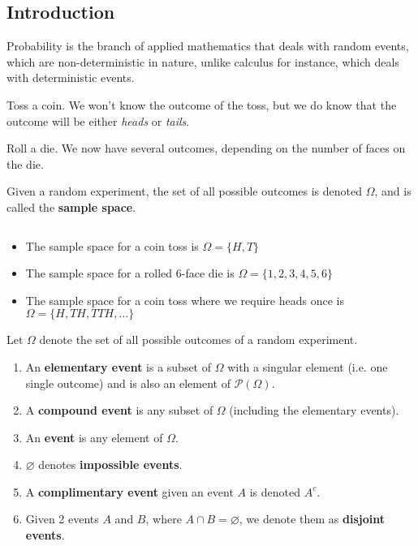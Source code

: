 \documentclass{article}
\begin{document}
	\subsection{Introduction}
	Probability is the branch of applied mathematics that deals with random events, which are non-deterministic in nature, unlike calculus for instance, which deals with deterministic events.
	\begin{exmp}
		Toss a coin. We won't know the outcome of the toss, but we do know that the outcome will be either \emph{heads} or \emph{tails}.
	\end{exmp} 
	\begin{exmp}
		Roll a die. We now have several outcomes, depending on the number of faces on the die.
	\end{exmp}
	\begin{defn}
		Given a random experiment, the set of all possible outcomes is denoted $\Omega$, and is called the \textbf{sample space}.
	\end{defn}
	\begin{exmp} $\quad$ \\
		\vspace{-0.5cm}
		\begin{itemize}
			\item The sample space for a coin toss is $\Omega = \{ H, T \}$
			\item The sample space for a rolled 6-face die is $\Omega = \{1,2,3,4,5,6\}$
			\item The sample space for a coin toss where we require heads once is $\Omega = \{ H, TH, TTH, \dots \}$
		\end{itemize}
	\end{exmp}
	\begin{defn}
		Let $\Omega$ denote the set of all possible outcomes of a random experiment.
		\begin{enumerate}[$\quad\,\,${2.2}.1.]
			\item An \textbf{elementary event} is a subset of $\Omega$ with a singular element (i.e. one single outcome) and is also an element of $\mathcal{P}(\Omega)$.
			\item A \textbf{compound event} is any subset of $\Omega$ (including the elementary events).
			\item An \textbf{event} is any element of $\Omega$.
			\item $\varnothing$ denotes \textbf{impossible events}.
			\item A \textbf{complimentary event} given an event $A$ is denoted $A^c$.
			\item Given 2 events $A$ and $B$, where $A \cap B = \varnothing$, we denote them as \textbf{disjoint events}.
		\end{enumerate}
	\end{defn}
\end{document}
